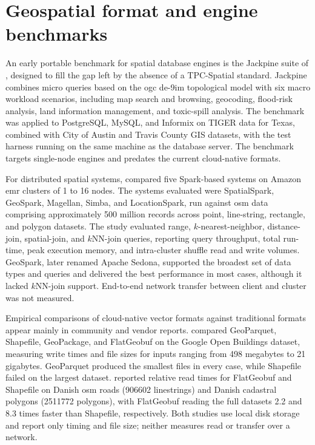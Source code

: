 \section{Geospatial format and engine benchmarks}
\label{related-work:geospatial-format-and-engine-benchmarks}

An early portable benchmark for spatial database engines is the Jackpine suite of \textcite{ray2011_jackpine_spatial_database_benchmark}, designed to fill the gap left by the absence of a TPC-Spatial standard. Jackpine combines micro queries based on the \acrshort{ogc} \acrfull{de-9im} topological model with six macro workload scenarios, including map search and browsing, geocoding, flood-risk analysis, land information management, and toxic-spill analysis. The benchmark was applied to PostgreSQL, MySQL, and Informix on TIGER data for Texas, combined with City of Austin and Travis County GIS datasets, with the test harness running on the same machine as the database server. The benchmark targets single-node engines and predates the current cloud-native formats.

For distributed spatial systems, \textcite{pandey2018_how_good_modern_spatial_analytics} compared five Spark-based systems on Amazon \acrshort{emr} clusters of \num{1} to \num{16} nodes. The systems evaluated were SpatialSpark, GeoSpark, Magellan, Simba, and LocationSpark, run against \acrshort{osm} data comprising approximately \num{500} million records across point, line-string, rectangle, and polygon datasets. The study evaluated range, $k$-nearest-neighbor, distance-join, spatial-join, and $k$NN-join queries, reporting query throughput, total run-time, peak execution memory, and intra-cluster shuffle read and write volumes. GeoSpark, later renamed Apache Sedona, supported the broadest set of data types and queries and delivered the best performance in most cases, although it lacked $k$NN-join support. End-to-end network transfer between client and cluster was not measured.

Empirical comparisons of cloud-native vector formats against traditional formats appear mainly in community and vendor reports. \textcite{holmes2023_geoparquet_performance} compared GeoParquet, Shapefile, GeoPackage, and FlatGeobuf on the Google Open Buildings dataset, measuring write times and file sizes for inputs ranging from \num{498} megabytes to \num{21} gigabytes. GeoParquet produced the smallest files in every case, while Shapefile failed on the largest dataset. \textcite{flatgeobuf2024_flatgeobuf_benchmarks} reported relative read times for FlatGeobuf and Shapefile on Danish \acrshort{osm} roads (\num{906602} linestrings) and Danish cadastral polygons (\num{2511772} polygons), with FlatGeobuf reading the full datasets \num{2.2} and \num{8.3} times faster than Shapefile, respectively. Both studies use local disk storage and report only timing and file size; neither measures read or transfer over a network.

